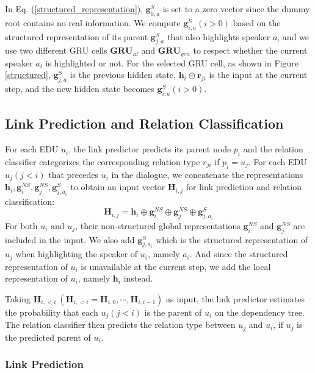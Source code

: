 \documentclass[letterpaper]{article} \usepackage{aaai19}  \usepackage{times}  \usepackage{helvet}  \usepackage{courier}  \usepackage{url}  \usepackage{graphicx}  \usepackage{amssymb}
\begin{document}
In Eq. (\ref{structured_representation}), $\bm{g}_{0,a}^S$ is set to a zero vector since the dummy root contains no real information. We compute $\bm{g}^S_{i,a}(i>0)$ based on the structured representation of its parent $\bm{g}^S_{j,a}$ that also highlights speaker $a$, and we use two different GRU cells $\mathbf{GRU}_{hl}$ and $\mathbf{GRU}_{gen}$ to respect whether the current speaker $a_i$ is highlighted or not. For the selected GRU cell, as shown in Figure \ref{structured}, $\bm{g}^S_{j,a}$ is the previous hidden state, $\bm{h}_i \oplus \bm{r}_{ji}$ is the input at the current step, and the new hidden state becomes $\bm{g}^S_{i,a}(i>0)$.

\subsection{Link Prediction and Relation Classification}

For each EDU $u_i$, the link predictor predicts its parent node $p_i$ and the relation classifier categorizes the corresponding relation type $r_{ji}$ if $p_i=u_j$. 
For each EDU $u_j(j<i)$ that precedes $u_i$ in the dialogue, we concatenate the representations $\bm{h}_i,\bm{g}^{NS}_i,\bm{g}^{NS}_j,\bm{g}^S_{j,a_i} $ to obtain an input vector $\bm{H}_{i,j}$ for link prediction and relation classification:
\begin{equation}
    \bm{H}_{i,j} = \bm{h}_i \oplus \bm{g}^{NS}_i \oplus \bm{g}^{NS}_j \oplus \bm{g}^S_{j,a_i}
    \label{H_input}
\end{equation}
For both $u_i$ and $u_j$, their non-structured global representations $\bm{g}^{NS}_i$ and $\bm{g}^{NS}_j$ are included in the input. 
We also add $\bm{g}^S_{j,a_i}$ which is the structured representation of $u_j$ when highlighting the speaker of $u_i$, namely $a_i$.
And since the structured representation of $u_i$ is unavailable at the current step, we add the local representation of $u_i$, namely $\bm{h}_i$ instead.

Taking $\bm{H}_{i,<i} \ (\bm{H}_{i,<i}=\bm{H}_{i,0},\cdots,\bm{H}_{i,i-1})$ as input, the link predictor estimates the probability that each $u_j(j<i)$ is the parent of $u_i$ on the dependency tree. The relation classifier then predicts the relation type between $u_j$ and $u_i$, if $u_j$ is the predicted parent of $u_i$.

\subsubsection{Link Prediction}
\end{document}
